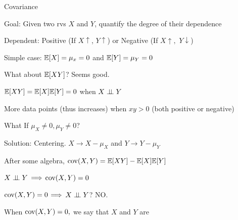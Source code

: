 \documentclass[handout,fleqn,aspectratio=169]{beamer}
\begin{document}
\begin{frame}{Covariance}

\plitemsep 0.1in

\bci 

\item<1-> Goal: Given two rvs $X$ and $Y$, quantify the degree of their dependence
\bci
\item<1-> Dependent: Positive (If $X \uparrow$, $Y \uparrow$) or Negative (If $X \uparrow,$ $Y \downarrow$)
\item<2-> Simple case: $\mathbb{E}[ X ] =\mu_x = 0$ and $\mathbb{E}[ Y ]=\mu_Y = 0$
\eci

\medskip
{}
{
\bci
\item<3-> What about $\mathbb{E}[ XY ]$? Seems good. 
\item<4-> $\mathbb{E}[ XY ] = \mathbb{E}[ X ]\mathbb{E}[ Y ]=0$ when $X \perp \!\!\! \perp Y$
\item<5-> More data points (thus increases) when $xy >0$ (both positive or negative)
\eci
}
{
\centering
{}
}

\eci

\end{frame}

\begin{frame}{What If $\mu_X \neq 0, \mu_Y \neq 0$?}

\plitemsep 0.1in

\bci 

\item<2-> Solution: Centering. $X \rightarrow X - \mu_X$ and $Y \rightarrow Y-\mu_Y$

\item<4-> After some algebra, $\text{cov}( X,Y ) = \mathbb{E}[ XY ] - \mathbb{E}[ X ]\mathbb{E}[ Y ]$

\item<5-> $X \perp \!\!\! \perp Y$ $\Longrightarrow$ $\text{cov}( X,Y )=0$

\item<6-> $\text{cov}( X,Y )=0$ $\Longrightarrow$ $X \perp \!\!\! \perp Y$? NO.

\item<7-> When $\text{cov}( X,Y )=0,$ we say that $X$ and $Y$ are 

\eci

\end{frame}
\end{document}
